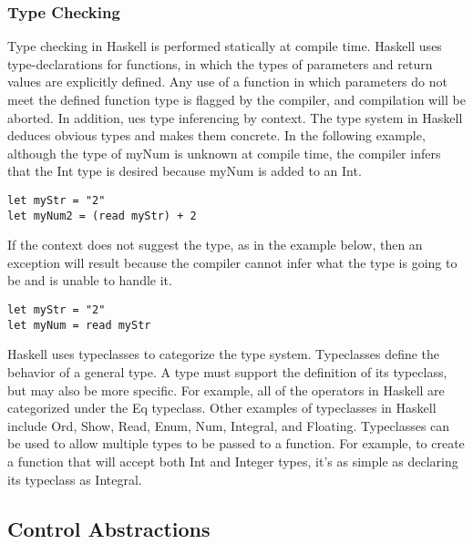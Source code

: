 \documentclass[titlepage,12pt]{article}
\begin{document}
\subsubsection{Type Checking}
Type checking in Haskell is performed statically at compile time. Haskell uses type-declarations for functions, in which the types of parameters and return values are explicitly defined. Any use of a function in which parameters do not meet the defined function type is flagged by the compiler, and compilation will be aborted. In addition, ues type inferencing by context. The type system in Haskell deduces obvious types and makes them concrete. In the following example, although the type of myNum is unknown at compile time, the compiler infers that the Int type is desired because myNum is added to an Int. 

\begin{verbatim}
let myStr = "2" 
let myNum2 = (read myStr) + 2
\end{verbatim}

If the context does not suggest the type, as in the example below, then an exception will result because the compiler cannot infer what the type is going to be and is unable to handle it. 

\begin{verbatim}
let myStr = "2" 
let myNum = read myStr
\end{verbatim}

Haskell uses typeclasses to categorize the type system. Typeclasses define the behavior of a general type. A type must support the definition of its typeclass, but may also be more specific. For example, all of the operators in Haskell are categorized under the Eq typeclass. Other examples of typeclasses in Haskell include Ord, Show, Read, Enum, Num, Integral, and Floating. Typeclasses can be used to allow multiple types to be passed to a function. For example, to create a function that will accept both Int and Integer types, it's as simple as declaring its typeclass as Integral.

\subsection{Control Abstractions}
\end{document}
